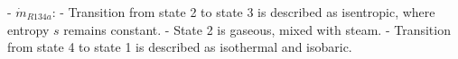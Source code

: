 - \( \dot{m}_{R134a} \):  
- Transition from state 2 to state 3 is described as isentropic, where entropy \( s \) remains constant.  
- State 2 is gaseous, mixed with steam.  
- Transition from state 4 to state 1 is described as isothermal and isobaric.